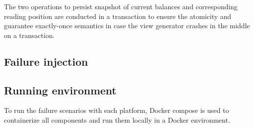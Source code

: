 The two operations to persist snapshot of current balances and corresponding reading position are conducted in a transaction to ensure the atomicity and guarantee exactly-once semantics in case the view generator crashes in the middle on a transaction.

\subsection{Failure injection}

\subsection{Running environment}
To run the failure scenarios with each platform, Docker compose is used to containerize all components and run them locally in a Docker environment. 